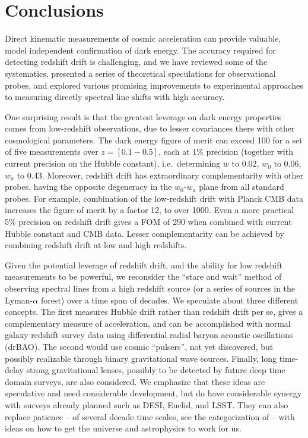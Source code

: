 \documentclass[preprint2, 10pt]{aastex}
\begin{document}
{%
\section{Conclusions} \label{sec:concl} 

Direct kinematic measurements of cosmic acceleration can provide valuable, 
model independent confirmation of dark energy. The accuracy required for 
detecting redshift drift is challenging, and we have reviewed some of the 
systematics, presented a series of theoretical speculations for observational 
probes, and explored various promising improvements to experimental 
approaches to measuring directly spectral line shifts with high accuracy.  

One surprising result is that the greatest leverage on dark energy properties 
comes from low-redshift observations, due to lesser covariances there with 
other cosmological parameters. The dark energy figure of merit can exceed 
100 for a set of five measurements over $z=[0.1-0.5]$, each at 1\% precision 
(together with current precision on the Hubble constant), i.e.\ determining 
$w$ to 0.02, $w_0$ to 0.06, $w_a$ to 0.43. Moreover, redshift drift 
has extraordinary complementarity with other probes, having the opposite 
degeneracy in the $w_0$-$w_a$ plane from all standard probes. For example, 
combination of the low-redshift drift with Planck CMB data increases 
the figure of merit by a factor 12, to over 1000. Even a more practical 
5\% precision on redshift drift gives a FOM of 290 when combined with 
current Hubble constant and CMB data. Lesser complementarity can be achieved 
by combining redshift drift at low and high redshifts. 

Given the potential leverage of redshift drift, and the ability for low 
redshift measurements to be powerful, we reconsider the ``stare and wait'' 
method of observing spectral lines from a high redshift source (or a 
series of sources in the Lyman-$\alpha$ forest) over a time span of decades. 
We speculate about three different concepts. The first measures Hubble drift 
rather than redshift drift per se, gives a complementary measure of 
acceleration, and can be accomplished with normal galaxy redshift survey 
data using differential radial baryon acoustic oscillations (drBAO). 
The second would use cosmic ``pulsers'', not yet discovered, but possibly 
realizable through binary gravitational wave sources. Finally, long time-delay
strong gravitational lenses, possibly to be detected by future deep 
time domain surveys, are also considered. We emphasize that these ideas 
are speculative and need considerable development, but do have considerable 
synergy with surveys already planned such as DESI, Euclid, and LSST.  They 
can also replace patience -- of several decade time scales, see the 
categorization of \citet{stebbins} -- with ideas on how to get the universe 
and astrophysics to work for us. 

}
\end{document}
